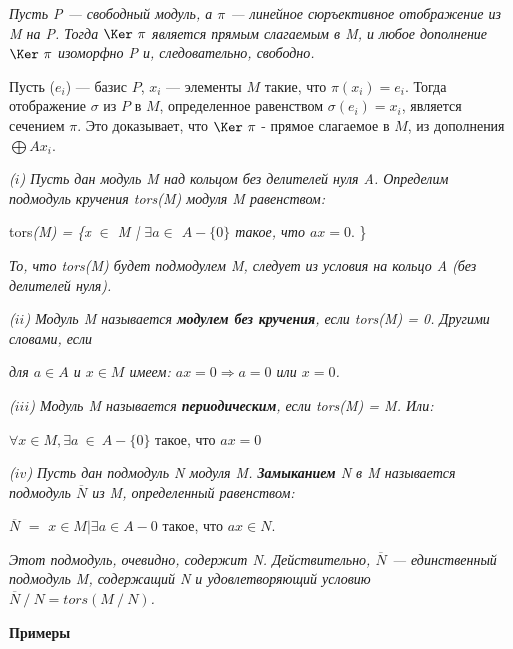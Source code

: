 \begin{sled}
\hspace*{0.5cm}
\textit{Пусть P — свободный модуль, а $\pi$ — линейное сюръективное отображение из M на P. Тогда $\Ker~\pi$ является прямым слагаемым в M, и любое дополнение $\Ker~\pi$ изоморфно P и, следовательно, свободно.}
\end{sled}
\begin{myproof}
Пусть ($e_i$) — базис $P$, $x_i$ — элементы $M$ такие, что
$\pi(x_i) = e_i$. Тогда отображение $\sigma$ из $P$ в $M$, определенное равенством $\sigma(e_i) = x_i$, является сечением $\pi$. Это доказывает, что $ \Ker~\pi$ - прямое слагаемое в $M$, из дополнения $\bigoplus Ax_i$.\\
\end{myproof}
\begin{determ}
\hspace*{0.5cm}
\textit{($i$) Пусть дан модуль M над кольцом без делителей нуля A. Определим подмодуль кручения tors(M) модуля M равенством:}
\begin{center}
tors\textit{(M) = \{x $\in$ M | $\exists a \in$ $A -\{0\}$  такое, что  $ax = 0$}. \}
\end{center}

\noindent\textit{То, что tors(M) будет подмодулем M, следует из условия на кольцо A (без делителей нуля).}

\textit{ ($ii$) Модуль M называется \textbf{модулем без кручения}, если tors(M) = 0. Другими словами, если}
\begin{center}
\textit{для $a \in A$ и $x \in M$ имеем: $ax = 0 \Rightarrow a = 0$ или $ x = 0$.}
\end{center}

\textit{ ($iii$) Модуль M называется \textbf{периодическим}, если tors(M) = M. Или:}
\begin{center}
$\forall x \in M, \exists a~ \in~ A - \{0\}$ такое, что $ax = 0$
\end{center}

\textit{ ($iv$) Пусть дан подмодуль N модуля M. \textbf{Замыканием} N в M называется подмодуль $\overline{N}$ из M, определенный равенством:}
\begin{center}
$\overline{N}$ $=$ {$x \in M | \exists a \in A - {0}$ такое, что $ax \in N$}.
\end{center}

\textit{Этот подмодуль, очевидно, содержит N. Действительно, 
$\overline{N}$ — единственный подмодуль M, содержащий N и удовлетворяющий условию\\ $ \overline{N}~/~N = tors(M~/~N)$.}
\end{determ}
\noindent\textbf{Примеры}

